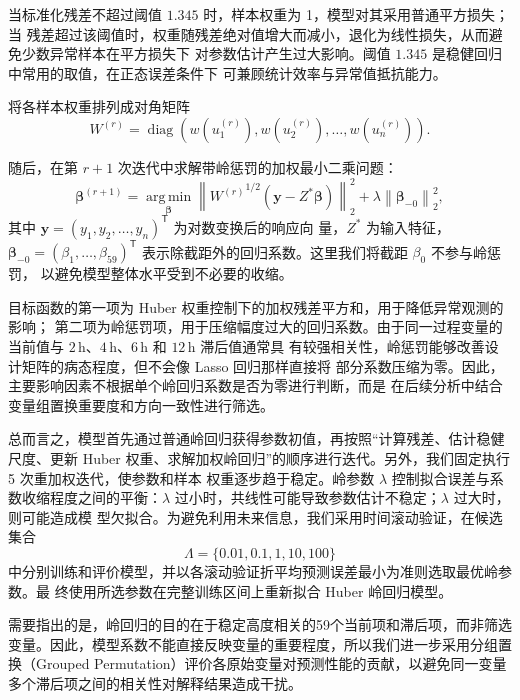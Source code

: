 \documentclass[UTF8,12pt,a4paper]{ctexart}
\begin{document}
当标准化残差不超过阈值 $1.345$ 时，样本权重为 1，模型对其采用普通平方损失；当
残差超过该阈值时，权重随残差绝对值增大而减小，退化为线性损失，从而避免少数异常样本在平方损失下
对参数估计产生过大影响。阈值 $1.345$ 是稳健回归中常用的取值，在正态误差条件下
可兼顾统计效率与异常值抵抗能力。

将各样本权重排列成对角矩阵
\begin{equation}
W^{(r)}
=
\operatorname{diag}
\left(
w\!\left(u_1^{(r)}\right),
w\!\left(u_2^{(r)}\right),
\ldots,
w\!\left(u_n^{(r)}\right)
\right).
\label{eq:huber-weight-matrix}
\end{equation}

随后，在第 $r+1$ 次迭代中求解带岭惩罚的加权最小二乘问题：
\begin{equation}
\boldsymbol\beta^{(r+1)}
=
\operatorname*{arg\,min}_{\boldsymbol\beta}
\left\|
{W^{(r)}}^{1/2}
\left(
\boldsymbol y-Z^*\boldsymbol\beta
\right)
\right\|_2^2
+
\lambda
\left\|
\boldsymbol\beta_{-0}
\right\|_2^2,
\label{eq:huber-ridge-objective}
\end{equation}
其中 $\boldsymbol y=(y_1,y_2,\ldots,y_n)^{\mathsf T}$ 为对数变换后的响应向
量，$Z^*$ 为输入特征，$\boldsymbol\beta_{-0}=(\beta_1,\ldots,
\beta_{59})^{\mathsf T}$ 表示除截距外的回归系数。这里我们将截距 $\beta_0$ 不参与岭惩罚，
以避免模型整体水平受到不必要的收缩。

目标函数的第一项为 Huber 权重控制下的加权残差平方和，用于降低异常观测的影响；
第二项为岭惩罚项，用于压缩幅度过大的回归系数。由于同一过程变量的当前值与 $2\,
\mathrm{h}$、$4\,\mathrm{h}$、$6\,\mathrm{h}$ 和 $12\,\mathrm{h}$ 滞后值通常具
有较强相关性，岭惩罚能够改善设计矩阵的病态程度，但不会像 Lasso 回归那样直接将
部分系数压缩为零。因此，主要影响因素不根据单个岭回归系数是否为零进行判断，而是
在后续分析中结合变量组置换重要度和方向一致性进行筛选。

总而言之，模型首先通过普通岭回归获得参数初值，再按照“计算残差、估计稳健尺度、更新 Huber
权重、求解加权岭回归”的顺序进行迭代。另外，我们固定执行 5 次重加权迭代，使参数和样本
权重逐步趋于稳定。岭参数 $\lambda$ 控制拟合误差与系数收缩程度之间的平衡：$
\lambda$ 过小时，共线性可能导致参数估计不稳定；$\lambda$ 过大时，则可能造成模
型欠拟合。为避免利用未来信息，我们采用时间滚动验证，在候选集合
\[
\Lambda=\{0.01,0.1,1,10,100\}
\]
中分别训练和评价模型，并以各滚动验证折平均预测误差最小为准则选取最优岭参数。最
终使用所选参数在完整训练区间上重新拟合 Huber 岭回归模型。

需要指出的是，岭回归的目的在于稳定高度相关的59个当前项和滞后项，而非筛选变量。因此，模型系数不能直接反映变量的重要程度，所以我们进一步采用分组置换（Grouped Permutation）评价各原始变量对预测性能的贡献，以避免同一变量多个滞后项之间的相关性对解释结果造成干扰。
\end{document}
